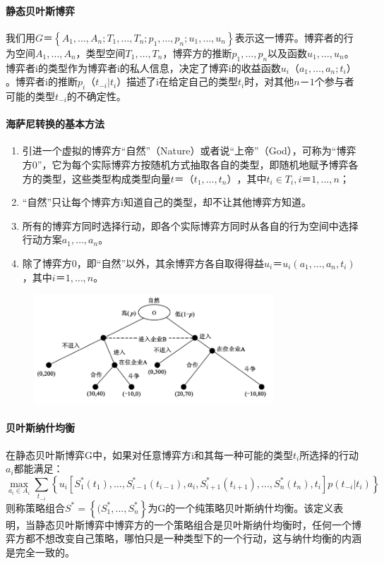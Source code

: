 \documentclass[12pt,a4paper]{article}
\begin{document}
\paragraph{静态贝叶斯博弈} 我们用$G＝\left \{ A_1, …, A_n; T_1,…,T_n;p_1,…,p_n;u_1,…,u_n \right \} $表示这一博弈。博弈者的行为空间$A_1,…,A_n$，类型空间$T_1,…,T_n$，博弈方的推断$p_1,…,p_n$以及函数$u_1,…,u_n$。博弈者i的类型作为博弈者i的私人信息，决定了博弈i的收益函数$u_i（a_1,…,a_n;t_i）$。博弈者i的推断$p_i（t_{-i}|t_i）$描述了i在给定自己的类型$t_i$时，对其他$n－1$个参与者可能的类型$t_{-i}$的不确定性。


\paragraph{海萨尼转换的基本方法}
\begin{enumerate}
	\item 引进一个虚拟的博弈方“自然”（Nature）或者说“上帝”（God），可称为“博弈方0”，它为每个实际博弈方按随机方式抽取各自的类型，即随机地赋予博弈各方的类型，这些类型构成类型向量$t＝（t_1,…,t_n）$，其中$t_i \in T_i, i＝1,…,n$；
	\item “自然”只让每个博弈方i知道自己的类型，却不让其他博弈方知道。
	\item 所有的博弈方同时选择行动，即各个实际博弈方同时从各自的行为空间中选择行动方案$a_1,…,a_n$。
	\item 除了博弈方0，即“自然”以外，其余博弈方各自取得得益$u_i＝u_i(a_1,…,a_n,t_i)$，其中$i＝1,…,n$。
\end{enumerate}
\begin{figure}[H]
	\centering
	\includegraphics[width=0.8\textwidth]{../images/game-theory-harsany.png}
	\caption{}
	\label{}
\end{figure}

\paragraph{贝叶斯纳什均衡} 在静态贝叶斯博弈G中，如果对任意博弈方i和其每一种可能的类型$t_i$所选择的行动$a_i$都能满足：
\begin{equation}
	\max_{a_i \in A_i} \sum_{t_{-i}} \left \{ u_i [S_1^*(t_1),...,S_{i-1}^*(t_{i-1}),a_i, S_{i+1}^*(t_{i+1}),...,S_n^*(t_n), t_i ]p(t_{-i}|t_i) \right \}
\end{equation}
则称策略组合$S^*=\left \{ (S_1^*,...,S_n^* \right \}$为G的一个纯策略贝叶斯纳什均衡。该定义表明，当静态贝叶斯博弈中博弈方的一个策略组合是贝叶斯纳什均衡时，任何一个博弈方都不想改变自己策略，哪怕只是一种类型下的一个行动，这与纳什均衡的内涵是完全一致的。
\end{document}
